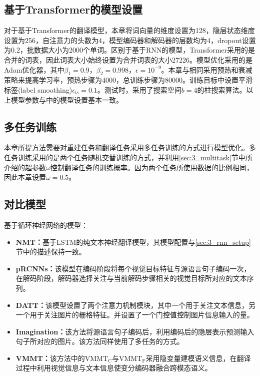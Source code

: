 \subsection{基于Transformer的模型设置}
\label{sec:3_transformer_setup}
对于基于Transformer的翻译模型，本章将词向量的维度设置为128，隐层状态维度设置为256，自注意力的头数为4，模型编码器和解码器的层数均为4，dropout设置为0.2，批数据大小为2000个单词。区别于基于RNN的模型，Transformer采用的是合并的词表，因此词表大小始终设置为合并词表的大小27226。模型优化采用的是Adam优化器，其中$\beta_1=0.9$，$\beta_2=0.998$，$\epsilon=10^{-9}$。本章与相同采用预热和衰减策略来提高学习率，预热步骤为4000，总训练步骤为80000。训练目标中设置平滑标签(label smoothing)$\epsilon_{ls}=0.1$。测试时，采用了搜索空间$b=4$的柱搜索算法。以上模型参数与中的模型设置基本一致。

\subsection{多任务训练}
本章所提方法需要对重建任务和翻译任务采用多任务训练的方式进行模型优化。多任务训练采用的是两个任务随机交替训练的方式，并利用\ref{sec:3_multitask}节中所介绍的超参数$\omega$控制翻译任务的训练概率。因为两个任务所使用数据的比例相同，因此本章设置$\omega=0.5$。

\subsection{对比模型}
基于循环神经网络的模型：
\begin{itemize}
    \item \textbf{NMT：}基于LSTM的纯文本神经翻译模型，其模型配置与\ref{sec:3_rnn_setup}节中的描述保持一致。
    \item \textbf{pRCNNs：}该模型在编码阶段将每个视觉目标特征与源语言句子编码一次，在解码阶段，解码器选择关注与当前解码步骤相关的视觉目标所对应的文本序列。
    \item \textbf{DATT：}该模型设置了两个注意力机制模块，其中一个用于关注文本信息，另一个用于关注图片的栅格特征。并设置了一个门控值控制图片信息输入的量。
    \item \textbf{Imagination：}该方法将源语言句子编码后，利用编码后的隐层表示预测输入句子所对应的图片。该方法同样使用了多任务的方式。
    \item \textbf{VMMT：}该方法中的$ \mathrm{VMMT_C} $与$ \mathrm{VMMT_F} $采用隐变量建模语义信息，在翻译过程中利用视觉信息与文本信息使变分编码器融合跨模态语义。
\end{itemize}

